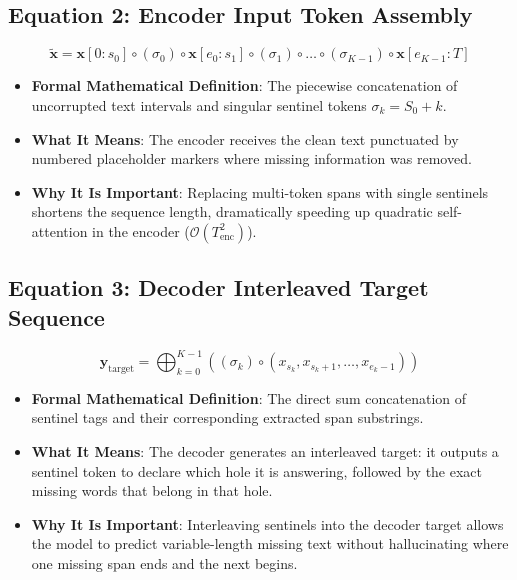 \documentclass[11pt,a4paper]{article}
\theoremstyle{definition}
\begin{document}
\subsection{\textbf{Equation 2: Encoder Input Token Assembly}}
{\boldmath
\begin{equation}
\tilde{\mathbf{x}} = \mathbf{x}[0:s_0] \circ (\sigma_0) \circ \mathbf{x}[e_0:s_1] \circ (\sigma_1) \circ \dots \circ (\sigma_{K-1}) \circ \mathbf{x}[e_{K-1}:T]
\end{equation}
}
\begin{itemize}
    \item \textbf{Formal Mathematical Definition}:
    The piecewise concatenation of uncorrupted text intervals and singular sentinel tokens $\sigma_k = S_0 + k$.
    \item \textbf{What It Means}:
    The encoder receives the clean text punctuated by numbered placeholder markers where missing information was removed.
    \item \textbf{Why It Is Important}:
    Replacing multi-token spans with single sentinels shortens the sequence length, dramatically speeding up quadratic self-attention in the encoder ($\mathcal{O}(T_{\text{enc}}^2)$).
\end{itemize}

\subsection{\textbf{Equation 3: Decoder Interleaved Target Sequence}}
{\boldmath
\begin{equation}
\mathbf{y}_{\text{target}} = \bigoplus_{k=0}^{K-1} \left( (\sigma_k) \circ (x_{s_k}, x_{s_k + 1}, \dots, x_{e_k - 1}) \right)
\end{equation}
}
\begin{itemize}
    \item \textbf{Formal Mathematical Definition}:
    The direct sum concatenation of sentinel tags and their corresponding extracted span substrings.
    \item \textbf{What It Means}:
    The decoder generates an interleaved target: it outputs a sentinel token to declare which hole it is answering, followed by the exact missing words that belong in that hole.
    \item \textbf{Why It Is Important}:
    Interleaving sentinels into the decoder target allows the model to predict variable-length missing text without hallucinating where one missing span ends and the next begins.
\end{itemize}
\end{document}
